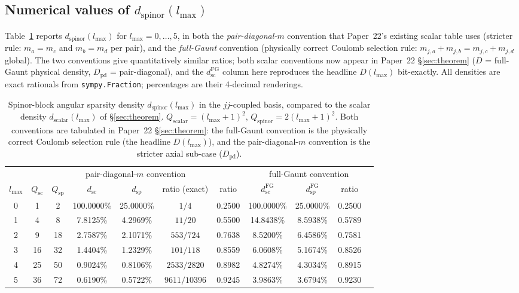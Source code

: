 \documentclass[twocolumn,pra,amsmath,amssymb,superscriptaddress]{revtex4-2}
\begin{document}
\subsection{Numerical values of $d_{\mathrm{spinor}}(l_{\max})$}

Table~\ref{tab:d_spinor} reports $d_{\mathrm{spinor}}(l_{\max})$ for
$l_{\max} = 0, \dots, 5$, in both the \emph{pair-diagonal-$m$}
convention that Paper~22's existing scalar table uses (stricter rule:
$m_a = m_c$ and $m_b = m_d$ per pair), and the \emph{full-Gaunt}
convention (physically correct Coulomb selection rule:
$m_{j,a} + m_{j,b} = m_{j,c} + m_{j,d}$ global). The two conventions
give quantitatively similar ratios; both scalar conventions now
appear in Paper~22 \S\ref{sec:theorem} ($D$ = full-Gaunt physical
density, $D_{\mathrm{pd}}$ = pair-diagonal), and the
$d_{\mathrm{sc}}^{\mathrm{FG}}$ column here reproduces the headline
$D(l_{\max})$ bit-exactly. All densities are exact rationals
from \texttt{sympy.Fraction}; percentages are their 4-decimal
renderings.

\begin{table}[h]
\caption{Spinor-block angular sparsity density $d_{\mathrm{spinor}}(l_{\max})$
in the $jj$-coupled basis, compared to the scalar density
$d_{\mathrm{scalar}}(l_{\max})$ of
\S\ref{sec:theorem}. $Q_{\mathrm{scalar}} = (l_{\max}+1)^2$,
$Q_{\mathrm{spinor}} = 2(l_{\max}+1)^2$. Both conventions are
tabulated in Paper~22 \S\ref{sec:theorem}: the full-Gaunt convention
is the physically correct Coulomb selection rule (the headline
$D(l_{\max})$), and the pair-diagonal-$m$ convention is the stricter
axial sub-case ($D_{\mathrm{pd}}$).}
\label{tab:d_spinor}
\begin{ruledtabular}
\begin{tabular}{c|cccccc|cccc}
 & \multicolumn{6}{c|}{pair-diagonal-$m$ convention} & \multicolumn{4}{c}{full-Gaunt convention} \\
$l_{\max}$ & $Q_{\mathrm{sc}}$ & $Q_{\mathrm{sp}}$ & $d_{\mathrm{sc}}$ & $d_{\mathrm{sp}}$ & ratio (exact) & ratio & $d_{\mathrm{sc}}^{\mathrm{FG}}$ & $d_{\mathrm{sp}}^{\mathrm{FG}}$ & ratio \\
\hline
0 & 1  & 2  & 100.0000\% & 25.0000\% & $1/4$        & 0.2500 & 100.0000\% & 25.0000\% & 0.2500 \\
1 & 4  & 8  & 7.8125\%   & 4.2969\%  & $11/20$      & 0.5500 & 14.8438\%  & 8.5938\%  & 0.5789 \\
2 & 9  & 18 & 2.7587\%   & 2.1071\%  & $553/724$    & 0.7638 & 8.5200\%   & 6.4586\%  & 0.7581 \\
3 & 16 & 32 & 1.4404\%   & 1.2329\%  & $101/118$    & 0.8559 & 6.0608\%   & 5.1674\%  & 0.8526 \\
4 & 25 & 50 & 0.9024\%   & 0.8106\%  & $2533/2820$  & 0.8982 & 4.8274\%   & 4.3034\%  & 0.8915 \\
5 & 36 & 72 & 0.6190\%   & 0.5722\%  & $9611/10396$ & 0.9245 & 3.9863\%   & 3.6794\%  & 0.9230 \\
\end{tabular}
\end{ruledtabular}
\end{table}
\end{document}
